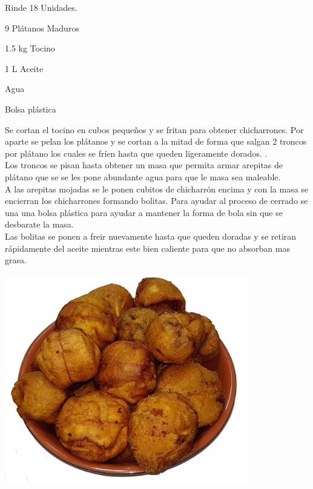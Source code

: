 
Rinde 18 Unidades.

\begin{ingredientes}
\item 9 Plátanos Maduros
\item 1.5 kg Tocino
\item 1 L Aceite 
\item Agua
\item Bolsa plástica
\end{ingredientes}
\preparacion

Se cortan el tocino en cubos pequeños y se fritan para obtener chicharrones. Por aparte se pelan los plátanos y se cortan a la mitad de forma que salgan 2 troncos por plátano los cuales se fríen hasta que queden ligeramente dorados. .\\

Los troncos se pisan hasta obtener un masa que permita armar arepitas de plátano que se se les pone abundante agua para que le masa sea maleable.\\

A las arepitas mojadas se le ponen cubitos de chicharrón encima y con la masa se encierran los chicharrones formando bolitas. Para ayudar al proceso de cerrado se una una bolsa plástica para ayudar a mantener la forma de bola sin que se desbarate la masa.\\

Las bolitas se ponen a freir nuevamente hasta que queden doradas y se retiran rápidamente del aceite mientras este bien caliente para que no absorban mas grasa.\\
\clearpage
\vspace*{5cm}
\begin{center}
\includegraphics[width=0.8\textwidth]{fotos/marranitas}
\end{center}